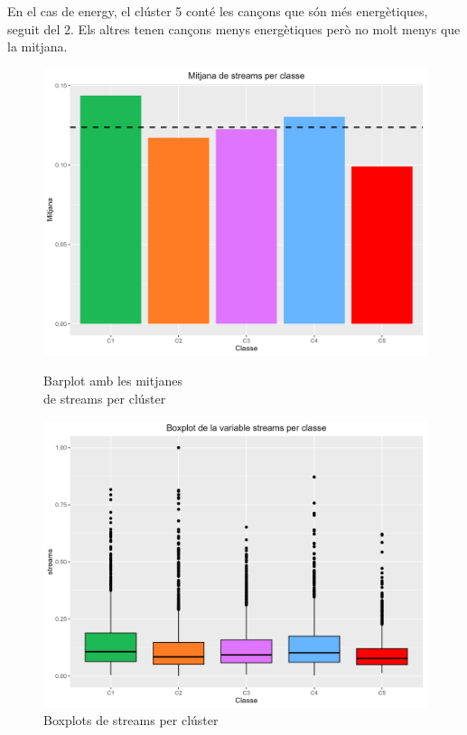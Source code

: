 En el cas de energy, el clúster 5 conté les cançons que són més energètiques, seguit del 2. Els altres tenen cançons menys energètiques però no molt menys que la mitjana. 
\begin{figure}[H]
\centering
    \begin{minipage}{.49\textwidth}
        \centering
        \includegraphics[width=0.95\linewidth]{Images/5_Profiling/numeriques/Num_BarPlot_streams.png}
        \caption{Barplot amb les mitjanes \\ de streams per clúster}
        \label{fig:Num_BarPlot_streams}
    \end{minipage}%
    \begin{minipage}{.49\textwidth}
        \centering
        \includegraphics[width=0.95\linewidth]{Images/5_Profiling/numeriques/Num_BoxPlot_streams.png}
        \caption{Boxplots de streams per clúster}
        \label{fig:Num_BoxPlot_streams}
    \end{minipage}%
\end{figure}

